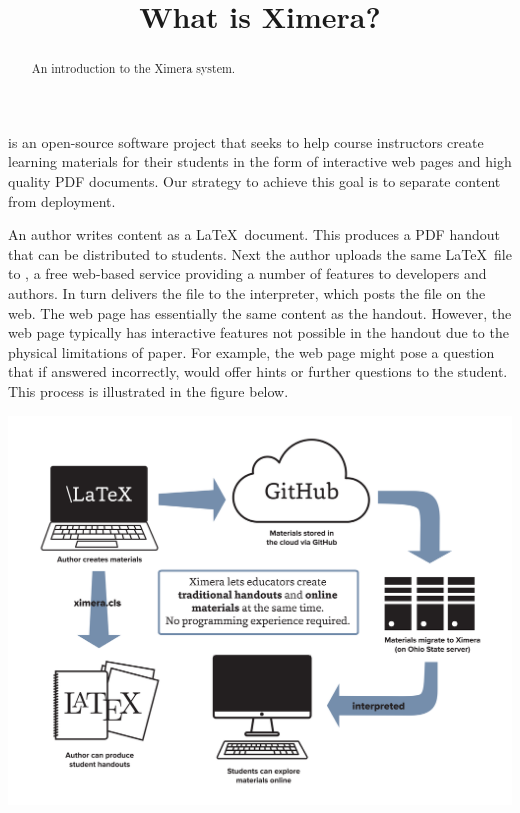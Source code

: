 \documentclass{ximera}
\title{What is Ximera?}
\begin{document}
\begin{abstract}
An introduction to the Ximera system.
\end{abstract}
\maketitle

 is an open-source software
project that seeks to help course instructors create learning
materials for their students in the form of interactive web pages and
high quality PDF documents.  Our strategy to achieve this goal is to
separate content from deployment.

An author writes content as a \LaTeX\ document.  This produces a PDF
handout that can be distributed to students.  Next the author uploads
the same \LaTeX\ file to , a free
web-based service providing a number of features to developers and
authors.  In turn  delivers the
file to the  interpreter, which
  posts the file on the web.  The web page has essentially the same
  content as the handout.  However, the web page typically has
  interactive features not possible in the handout due to the physical
  limitations of paper.  For example, the web page might pose a
  question that if answered incorrectly, would offer hints or further
  questions to the student.  This process is illustrated in the figure
  below.

\begin{image}
\includegraphics[scale=.25]{XimeraGraphic.png}
\end{image}
\end{document}
